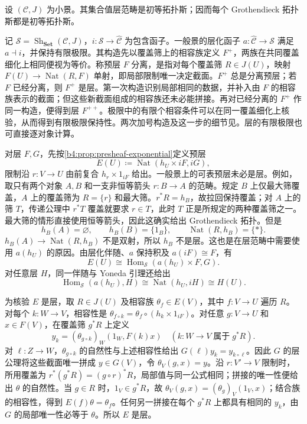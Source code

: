 \begin{theorem}\label{b4:thm:site-topos}
	设 \((\mathcal C,J)\) 为小景。其集合值层范畴是初等拓扑斯；因而每个 Grothendieck 拓扑斯都是初等拓扑斯。
\end{theorem}
\begin{proofsketch}
	记 \(\mathcal S=\operatorname{Sh}_{\mathbf{Set}}(\mathcal C,J)\)，\(i:\mathcal S\to\widehat{\mathcal C}\) 为包含函子。一般景的层化函子 \(a:\widehat{\mathcal C}\to\mathcal S\) 满足 \(a\dashv i\)，并保持有限极限。其构造先以覆盖筛上的相容族定义 \(F^+\)，两族在共同覆盖细化上相同便视为等价。称预层 \(F\) 分离，是指对每个覆盖筛 \(R\in J(U)\)，映射 \(F(U)\to\operatorname{Nat}(R,F)\) 单射，即局部限制唯一决定截面。\(F^+\) 总是分离预层；若 \(F\) 已经分离，则 \(F^+\) 是层。第一次构造识别局部相同的数据，并补入由 \(F\) 的相容族表示的截面；但这些新截面组成的相容族还未必能拼接。再对已经分离的 \(F^+\) 作同一构造，便得到层 \(F^{++}\)。极限中的有限个相容条件可以在同一覆盖细化上核验，从而得到有限极限保持性。两次加号构造及这一步的细节见\cite[Chapter III, Section 5]{MacLaneMoerdijk1992Sheaves}。层的有限极限也可直接逐对象计算。

	对层 \(F,G\)，先按\cref{b4:prop:presheaf-exponential}定义预层
	\[
		E(U)\coloneqq\operatorname{Nat}(h_U\times iF,iG),
	\]
	限制沿 \(r:V\to U\) 由前复合 \(h_r\times1_{iF}\) 给出。一般景上的可表预层未必是层。例如，取只有两个对象 \(A,B\) 和一支非恒等箭头 \(r:B\to A\) 的范畴。规定 \(B\) 上仅最大筛覆盖，\(A\) 上的覆盖筛为 \(R=\{r\}\) 和最大筛。\(r^*R=h_B\)，故拉回保持覆盖；对 \(A\) 上的筛 \(T\)，传递公理中 \(r^*T\) 覆盖就要求 \(r\in T\)，此时 \(T\) 正是所规定的两种覆盖筛之一。最大筛的情形直接使用恒等箭头，因此这确实给出 Grothendieck 拓扑。但是
	\[
		h_B(A)=\varnothing,\qquad h_B(B)=\{1_B\},\qquad \operatorname{Nat}(R,h_B)=\{*\}.
	\]
	\(h_B(A)\to\operatorname{Nat}(R,h_B)\) 不是双射，所以 \(h_B\) 不是层。这也是在层范畴中需要使用 \(a(h_U)\) 的原因。由层化伴随、\(a\) 保持积及 \(a(iF)\cong F\)，有
	\[
		E(U)\cong\operatorname{Hom}_{\mathcal S}(a(h_U)\times F,G).
	\]
	对任意层 \(H\)，同一伴随与 Yoneda 引理还给出
	\[
		\operatorname{Hom}_{\mathcal S}(a(h_U),H) \cong\operatorname{Nat}(h_U,iH)\cong H(U).
	\]

	为核验 \(E\) 是层，取 \(R\in J(U)\) 及相容族 \(\theta_f\in E(V)\)，其中 \(f:V\to U\) 遍历 \(R\)。对每个 \(k:W\to V\)，相容性是 \(\theta_{f\circ k}=\theta_f\circ(h_k\times1_{iF})\)。对任意 \(g:V\to U\) 和 \(x\in F(V)\)，在覆盖筛 \(g^*R\) 上定义
	\[
		y_k=(\theta_{g\circ k})_W(1_W,F(k)x) \quad(k:W\to V\;\text{属于}\;g^*R).
	\]
	对 \(\ell:Z\to W\)，\(\theta_{g\circ k}\) 的自然性与上述相容性给出 \(G(\ell)y_k=y_{k\circ\ell}\)。因此 \(G\) 的层公理将这些截面唯一拼成 \(y\in G(V)\)，令 \(\theta_V(g,x)=y\)。沿 \(r:V'\to V\) 限制时，所用覆盖为 \(r^*(g^*R)=(g\circ r)^*R\)，局部值与同一公式相同；拼接的唯一性便给出 \(\theta\) 的自然性。当 \(g\in R\) 时，\(1_V\in g^*R\)，故 \(\theta_V(g,x)=(\theta_g)_V(1_V,x)\)；结合族的相容性，得到 \(E(f)\theta=\theta_f\)。任何另一拼接在每个 \(g^*R\) 上都具有相同的 \(y_k\)，由 \(G\) 的局部唯一性必等于 \(\theta\)。所以 \(E\) 是层。


\end{proofsketch}
